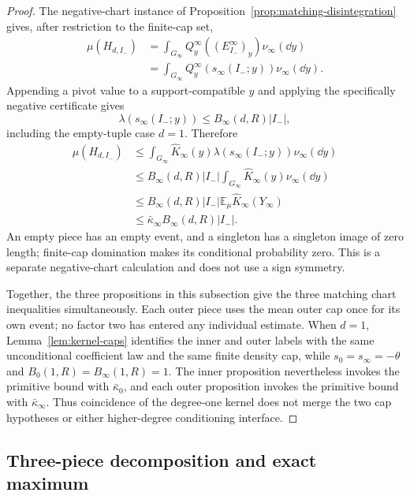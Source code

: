 \begin{proof}
The negative-chart instance of Proposition~\ref{prop:matching-disintegration}
gives, after restriction to the finite-cap set,
\[
\begin{aligned}
\mu(H_{d,I_-})
&=\int_{G_\infty}Q^\infty_y((E^\infty_{I_-})_y)\nu_\infty(\dd y)\\
&=\int_{G_\infty}Q^\infty_y(s_\infty(I_-;y))\nu_\infty(\dd y).
\end{aligned}
\]
Appending a pivot value to a support-compatible $y$ and applying the
specifically negative certificate gives
\[
\lambda(s_\infty(I_-;y))\leq B_\infty(d,R)|I_-|,
\]
including the empty-tuple case $d=1$.  Therefore
\[
\begin{aligned}
\mu(H_{d,I_-})
&\leq\int_{G_\infty}\widehat K_\infty(y)
       \lambda(s_\infty(I_-;y))\nu_\infty(\dd y)\\
&\leq B_\infty(d,R)|I_-|
       \int_{G_\infty}\widehat K_\infty(y)\nu_\infty(\dd y)\\
&\leq B_\infty(d,R)|I_-|
       \mathbb E_\mu\widehat K_\infty(Y_\infty)\\
&\leq\bar\kappa_\infty B_\infty(d,R)|I_-|.
\end{aligned}
\]
An empty piece has an empty event, and a singleton has a singleton image of
zero length; finite-cap domination makes its conditional probability zero.
This is a separate negative-chart calculation and does not use a sign
symmetry.

Together, the three propositions in this subsection give the three matching
chart inequalities simultaneously.  Each outer piece uses the mean outer cap
once for its own event; no factor two has entered any individual estimate.
When $d=1$, Lemma~\ref{lem:kernel-caps} identifies the inner and outer labels
with the same unconditional coefficient law and the same finite density cap,
while $s_0=s_\infty=-\theta$ and $B_0(1,R)=B_\infty(1,R)=1$.  The inner
proposition nevertheless invokes the primitive bound with $\bar\kappa_0$,
and each outer proposition invokes the primitive bound with
$\bar\kappa_\infty$.  Thus coincidence of the degree-one kernel does not
merge the two cap hypotheses or either higher-degree conditioning interface.
\end{proof}

\subsection{Three-piece decomposition and exact maximum}
\label{app:three-piece}


